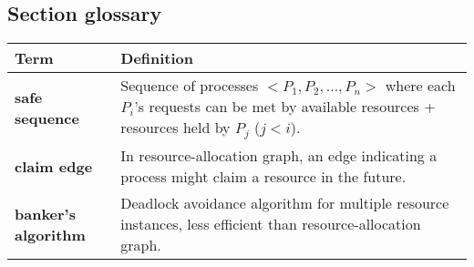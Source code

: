 \subsection*{Section glossary}
\begin{tabular}{p{}p{}}
    \toprule
    \textbf{Term} & \textbf{Definition} \\
    \midrule
    \textbf{safe sequence} & Sequence of processes $<P_1, P_2, \dots, P_n>$ where each $P_i$'s requests can be met by available resources + resources held by $P_j$ ($j < i$). \\
    \textbf{claim edge} & In resource-allocation graph, an edge indicating a process might claim a resource in the future. \\
    \textbf{banker's algorithm} & Deadlock avoidance algorithm for multiple resource instances, less efficient than resource-allocation graph. \\
    \bottomrule
\end{tabular}
